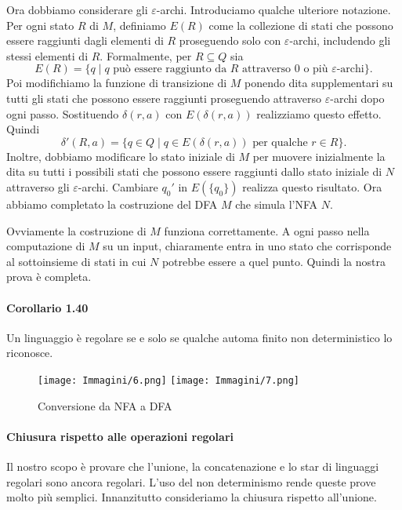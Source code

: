 \documentclass{article}
\begin{document}
    Ora dobbiamo considerare gli $\varepsilon$-archi. Introduciamo qualche ulteriore notazione. Per ogni stato $R$ di $M$, definiamo $E(R)$ come la collezione di stati che possono essere raggiunti dagli elementi di $R$ proseguendo solo con $\varepsilon$-archi, includendo gli stessi elementi di $R$. Formalmente, per $R \subseteq Q$ sia
    \[
        E(R) = \{q \mid q \text{ può essere raggiunto da } R \text{ attraverso 0 o più } \varepsilon\text{-archi}\}.
    \]
    Poi modifichiamo la funzione di transizione di $M$ ponendo dita supplementari su tutti gli stati che possono essere raggiunti proseguendo attraverso $\varepsilon$-archi dopo ogni passo. Sostituendo $\delta(r, a)$ con $E(\delta(r, a))$ realizziamo questo effetto. Quindi
    \[
        \delta'(R, a) = \{q \in Q \mid q \in E(\delta(r, a)) \text{ per qualche } r \in R\}.
    \]
    Inoltre, dobbiamo modificare lo stato iniziale di $M$ per muovere inizialmente la dita su tutti i possibili stati che possono essere raggiunti dallo stato iniziale di $N$ attraverso gli $\varepsilon$-archi. Cambiare $q_0'$ in $E(\{q_0\})$ realizza questo risultato. Ora abbiamo completato la costruzione del DFA $M$ che simula l'NFA $N$.
    
    Ovviamente la costruzione di $M$ funziona correttamente. A ogni passo nella computazione di $M$ su un input, chiaramente entra in uno stato che corrisponde al sottoinsieme di stati in cui $N$ potrebbe essere a quel punto. Quindi la nostra prova è completa.

\paragraph{Corollario 1.40}
\text{  }
\begin{tcolorbox}[colback=purple!10!white, colframe=purple!50!black, title=Corollario 1.40]\label{corollario-1.40}
Un linguaggio è regolare se e solo se qualche automa finito non deterministico lo riconosce.
\end{tcolorbox}

\begin{figure}[H]
    \centering
    \texttt{[image: Immagini/6.png]}
    \texttt{[image: Immagini/7.png]}
    \caption{Conversione da NFA a DFA}
    \label{fig:nfa_example1}
\end{figure}

\paragraph{Chiusura rispetto alle operazioni regolari}
\vspace{1em}
\text{}
\newline
Il nostro scopo è provare che l'unione, la concatenazione e lo star di linguaggi regolari sono ancora regolari. L'uso del non determinismo rende queste prove molto più semplici.
Innanzitutto consideriamo la chiusura rispetto all'unione.
\end{document}
